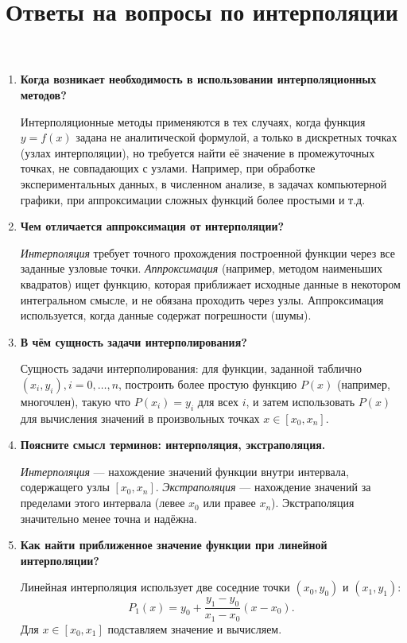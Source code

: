 \documentclass[a4paper,12pt]{article}
\title{Ответы на вопросы по интерполяции}
\author{}
\date{}
\begin{document}
\maketitle

\begin{enumerate}

\item \textbf{Когда возникает необходимость в использовании интерполяционных методов?}

	Интерполяционные методы применяются в тех случаях, когда функция \( y = f(x) \) задана не аналитической формулой, а только в дискретных точках (узлах интерполяции), но требуется найти её значение в промежуточных точках, не совпадающих с узлами. Например, при обработке экспериментальных данных, в численном анализе, в задачах компьютерной графики, при аппроксимации сложных функций более простыми и т.д.

\item \textbf{Чем отличается аппроксимация от интерполяции?}

	\textit{Интерполяция} требует точного прохождения построенной функции через все заданные узловые точки. \textit{Аппроксимация} (например, методом наименьших квадратов) ищет функцию, которая приближает исходные данные в некотором интегральном смысле, и не обязана проходить через узлы. Аппроксимация используется, когда данные содержат погрешности (шумы).

\item \textbf{В чём сущность задачи интерполирования?}

	Сущность задачи интерполирования: для функции, заданной таблично \( (x_i, y_i), i=0,\dots,n \), построить более простую функцию \( P(x) \) (например, многочлен), такую что \( P(x_i) = y_i \) для всех \( i \), и затем использовать \( P(x) \) для вычисления значений в произвольных точках \( x \in [x_0, x_n] \).

\item \textbf{Поясните смысл терминов: интерполяция, экстраполяция.}

	\textit{Интерполяция} — нахождение значений функции внутри интервала, содержащего узлы \( [x_0, x_n] \). \textit{Экстраполяция} — нахождение значений за пределами этого интервала (левее \( x_0 \) или правее \( x_n \)). Экстраполяция значительно менее точна и надёжна.

\item \textbf{Как найти приближенное значение функции при линейной интерполяции?}

	Линейная интерполяция использует две соседние точки \( (x_0, y_0) \) и \( (x_1, y_1) \):
	\[
	P_1(x) = y_0 + \frac{y_1 - y_0}{x_1 - x_0} (x - x_0).
	\]
	Для \( x \in [x_0, x_1] \) подставляем значение и вычисляем.


\end{enumerate}
\end{document}

